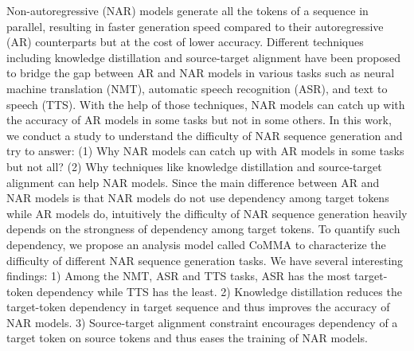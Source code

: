 Non-autoregressive (NAR) models generate all the tokens of a sequence in parallel, resulting in faster generation speed compared to their autoregressive (AR) counterparts but at the cost of lower accuracy. Different techniques including knowledge distillation and source-target alignment have been proposed to bridge the gap between AR and NAR models in various tasks such as neural machine translation (NMT), automatic speech recognition (ASR), and text to speech (TTS). With the help of those techniques, NAR models can catch up with the accuracy of AR models in some tasks but not in some others. In this work, we conduct a study to understand the difficulty of NAR sequence generation and try to answer: (1) Why NAR models can catch up with AR models in some tasks but not all? (2) Why techniques like knowledge distillation and source-target alignment can help NAR models. Since the main difference between AR and NAR models is that NAR models do not use dependency among target tokens while AR models do, intuitively the difficulty of NAR sequence generation heavily depends on the strongness of dependency among target tokens. To quantify such dependency, we propose an analysis model called CoMMA to characterize the difficulty of different NAR sequence generation tasks. We have several interesting findings: 1) Among the NMT, ASR and TTS tasks, ASR has the most target-token dependency while TTS has the least. 2) Knowledge distillation reduces the target-token dependency in target sequence and thus improves the accuracy of NAR models. 3) Source-target alignment constraint encourages dependency of a target token on source tokens and thus eases the training of NAR models.
